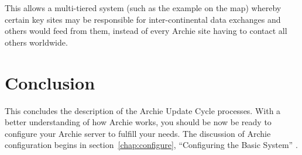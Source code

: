 This allows a multi-tiered system (such as the example on the map) whereby
certain key sites may be responsible for inter-continental data exchanges and
others would feed from them, instead of every Archie site having to contact
all others worldwide.




\section{Conclusion}

This concludes the description of the Archie Update Cycle processes. With a
better understanding of how Archie works, you should be now be ready to
configure your Archie server to fulfill your needs. The discussion of Archie
configuration begins in section~\ref{chap:configure}, ``Configuring the Basic System'' .


